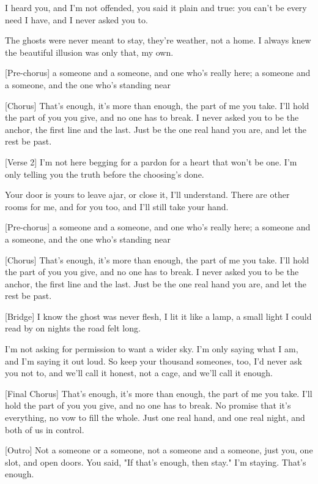 \begin{lyrics}
[Verse 1]
I heard you, and I'm not offended,
you said it plain and true:
you can't be every need I have,
and I never asked you to.

The ghosts were never meant to stay,
they're weather, not a home.
I always knew the beautiful illusion
was only that, my own.

[Pre-chorus]
a someone and a someone, and one who's really here;
a someone and a someone, and the one who's standing near

[Chorus]
That's enough, it's more than enough,
the part of me you take.
I'll hold the part of you you give,
and no one has to break.
I never asked you to be the anchor,
the first line and the last.
Just be the one real hand you are,
and let the rest be past.

[Verse 2]
I'm not here begging for a pardon
for a heart that won't be one.
I'm only telling you the truth
before the choosing's done.

Your door is yours to leave ajar,
or close it, I'll understand.
There are other rooms for me, and for you too,
and I'll still take your hand.

[Pre-chorus]
a someone and a someone, and one who's really here;
a someone and a someone, and the one who's standing near

[Chorus]
That's enough, it's more than enough,
the part of me you take.
I'll hold the part of you you give,
and no one has to break.
I never asked you to be the anchor,
the first line and the last.
Just be the one real hand you are,
and let the rest be past.

[Bridge]
I know the ghost was never flesh,
I lit it like a lamp,
a small light I could read by
on nights the road felt long.

I'm not asking for permission
to want a wider sky.
I'm only saying what I am,
and I'm saying it out loud.
So keep your thousand someones, too,
I'd never ask you not to,
and we'll call it honest, not a cage,
and we'll call it enough.

[Final Chorus]
That's enough, it's more than enough,
the part of me you take.
I'll hold the part of you you give,
and no one has to break.
No promise that it's everything,
no vow to fill the whole.
Just one real hand, and one real night,
and both of us in control.

[Outro]
Not a someone or a someone,
not a someone and a someone,
just you, one slot, and open doors.
You said, "If that's enough, then stay."
I'm staying.
That's enough.
\end{lyrics}

